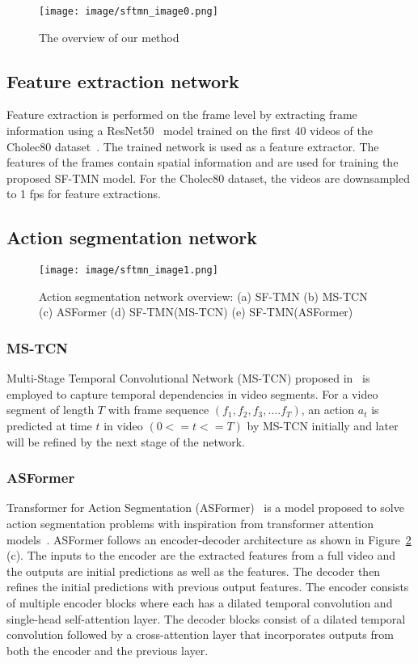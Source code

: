 \documentclass[sn-mathphys,Numbered]{sn-jnl}
\theoremstyle{thmstyleone}\newtheorem{theorem}{Theorem}\newtheorem{proposition}[theorem]{Proposition}
\theoremstyle{thmstyletwo}\newtheorem{example}{Example}\newtheorem{remark}{Remark}
\theoremstyle{thmstylethree}\newtheorem{definition}{Definition}
\begin{document}
\begin{figure}[h]\centering
\texttt{[image: image/sftmn\_image0.png]}
\caption{The overview of our method }\label{fig1}
\end{figure}

\subsection{Feature extraction network}
Feature extraction is performed on the frame level by extracting frame information using a ResNet50~\cite{he2016deep} model trained on the first 40 videos of the Cholec80 dataset~\cite{twinanda2016endonet}. The trained network is used as a feature extractor. The features of the frames contain spatial information and are used for training the proposed SF-TMN model. For the Cholec80 dataset, the videos are downsampled to 1 fps for feature extractions.

\subsection{Action segmentation network}
\begin{figure}[h]\centering
\texttt{[image: image/sftmn\_image1.png]}
\caption{Action segmentation network overview: (a) SF-TMN (b) MS-TCN (c) ASFormer (d) SF-TMN(MS-TCN) (e) SF-TMN(ASFormer)}\label{fig2}
\end{figure}
\subsubsection{MS-TCN}
Multi-Stage Temporal Convolutional Network (MS-TCN) proposed in~\cite{farha2019ms} is employed to capture temporal dependencies in video segments. For a video segment of length $T$ with frame sequence $(f_1, f_2, f_3,....f_T)$, an action $a_t$ is predicted at time $t$ in video $(0<=t<=T)$ by MS-TCN initially and later will be refined by the next stage of the network. 

\subsubsection{ASFormer}
Transformer for Action Segmentation (ASFormer)~\cite{yi2021asformer} is a model proposed to solve action segmentation problems with inspiration from transformer attention models~\cite{vaswani2017attention}. ASFormer follows an encoder-decoder architecture as shown in Figure~\ref{fig2} (c). The inputs to the encoder are the extracted features from a full video and the outputs are initial predictions as well as the features. The decoder then refines the initial predictions with previous output features. 
The encoder consists of multiple encoder blocks where each has a dilated temporal convolution and single-head self-attention layer. The decoder blocks consist of a dilated temporal convolution followed by a cross-attention layer that incorporates outputs from both the encoder and the previous layer. 
\end{document}
